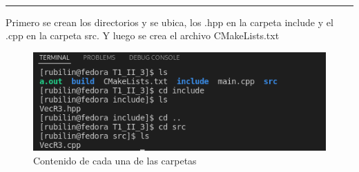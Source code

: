 \documentclass[11pt]{article}
\begin{document}
	\theoremstyle{Tema} \newtheorem{Tema}{Tema} %
	\theoremstyle{Tema} \newtheorem{serie}{Serie}              %
	\theoremstyle{Tema} \newtheorem{ejercicio}{Ejercicio}    %
	
	
	{
		
		\fancyhead[L]{ 
		}
	}
	
	{
		\renewcommand{\headrulewidth}{1 pt}
		\fancyhead[R]{
			\emph{\myDoc $-$ \myCourse} %
		}
		\fancyhead[L]{}  
		\fancyfoot[C]{}
		\fancyfoot[R]{\thepage}
	}
	
	\date{}
	\setlength{\headheight}{0.65 in} %
	
	\pagestyle{allStyle}
	
	\thispagestyle{firststyle}
	\begin{center}
		\LARGE
		\textsc{\myDoc}\\\normalsize %
		\medskip
		\hrule height 1pt
	\end{center}
	
	
	Primero se crean los directorios y se ubica, los .hpp en la carpeta include y el .cpp en la carpeta src. Y luego se crea el archivo CMakeLists.txt
	\begin{figure}[H]
		\centering
		\includegraphics[width=0.7\linewidth]{img1}
		\caption{Contenido de cada una de las carpetas }
		\label{fig:img1}
	\end{figure}
	
\end{document}
